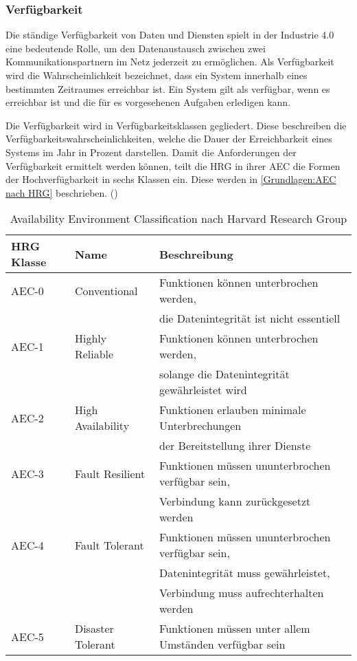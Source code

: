 \subsubsection{Verfügbarkeit}
Die ständige Verfügbarkeit von Daten und Diensten spielt in der Industrie 4.0 eine bedeutende Rolle, um den Datenaustausch zwischen zwei Kommunikationspartnern im Netz jederzeit zu ermöglichen. Als Verfügbarkeit wird die Wahrscheinlichkeit bezeichnet, dass ein System innerhalb eines bestimmten Zeitraumes erreichbar ist. Ein System gilt als verfügbar, wenn es erreichbar ist und die für es vorgesehenen Aufgaben erledigen kann. 

Die Verfügbarkeit wird in Verfügbarkeitsklassen gegliedert. Diese beschreiben die Verfügbarkeitswahrscheinlichkeiten, welche die Dauer der Erreichbarkeit eines Systems im Jahr in Prozent darstellen. Damit die Anforderungen der Verfügbarkeit ermittelt werden können, teilt die \ac{HRG} in ihrer \ac{AEC} die Formen der Hochverfügbarkeit in sechs Klassen ein. Diese werden in \autoref{Grundlagen:AEC nach HRG} beschrieben. (\cite{AEC2003})

\begin{table}[h]
  \caption{Availability Environment Classification nach Harvard Research Group}
  \label{Grundlagen:AEC nach HRG}
  \renewcommand{\arraystretch}{1.2}
  \centering
  \sffamily
  \begin{footnotesize}
    \begin{tabular}{l l l}
    \toprule
    \textbf{HRG Klasse} & \textbf{Name} & \textbf{Beschreibung}\\
    \midrule
    AEC-0	&	Conventional & 	Funktionen können unterbrochen werden,\\
          &              &  die Datenintegrität ist nicht essentiell\\
    AEC-1	&	Highly Reliable	&	Funktionen können unterbrochen werden,\\
          &                 & solange die Datenintegrität gewährleistet wird\\
    AEC-2	&	High Availability	&	Funktionen erlauben minimale Unterbrechungen\\
          &                   & der Bereitstellung ihrer Dienste\\
    AEC-3	&	Fault Resilient	&	Funktionen müssen ununterbrochen verfügbar sein,\\
          &                 & Verbindung kann zurückgesetzt werden\\
    AEC-4 & Fault Tolerant & Funktionen müssen ununterbrochen verfügbar sein,\\
          &                & Datenintegrität muss gewährleistet,\\
          &                & Verbindung muss aufrechterhalten werden\\
    AEC-5 & Disaster Tolerant & Funktionen müssen unter allem Umständen verfügbar sein\\
    \bottomrule
    \end{tabular}
  \end{footnotesize}
  \rmfamily
\end{table}

